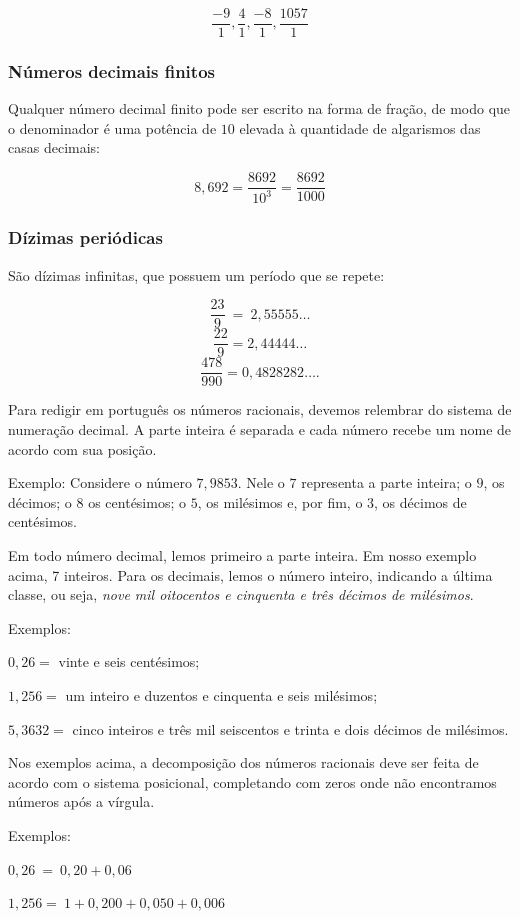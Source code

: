 { $$\frac{-9}{1},  \frac{4}{1}, \frac{-8}{1},  \frac{1057}{1}$$

\subsubsection*{Números decimais finitos} Qualquer número decimal finito pode ser
escrito na forma de fração, de modo que o denominador é uma potência de
$10$ elevada à quantidade de algarismos das casas decimais:

$$8,692  = \frac{8692}{10^{3}} = \frac{8692}{1000}$$

\subsubsection*{Dízimas periódicas} 
São dízimas infinitas, que possuem um período que se repete: 

$$\frac{23}{9}\  = \ 2,55555\ldots{}$$
$$\frac{22}{9} = 2,44444\ldots{}$$
$$\frac{478}{990} = 0,4828282\ldots{}.$$

Para redigir em português os números racionais, devemos relembrar do
sistema de numeração decimal. A parte inteira é separada e cada número
recebe um nome de acordo com sua posição.

\medskip\noindent Exemplo: Considere o número 
$7,9853$. Nele o $7$ representa a parte inteira; o $9$, os décimos; o $8$ os centésimos; o $5$, os milésimos e, por fim, o $3$,
os décimos de centésimos.

Em todo número decimal, lemos primeiro a parte inteira. Em nosso exemplo acima, 7
inteiros. Para os decimais, lemos o número inteiro, indicando a última
classe, ou seja, \textit{nove mil oitocentos e cinquenta e três décimos de
milésimos}.

\medskip\noindent Exemplos:

$0,26 =$ vinte e seis centésimos;

$1,256 =$ um inteiro e duzentos e cinquenta e seis milésimos;

$5,3632 =$ cinco inteiros e três mil seiscentos e trinta e dois décimos de
milésimos.


\medskip
Nos exemplos acima, a decomposição dos números racionais deve ser feita de 
acordo com o sistema posicional, completando com zeros onde não encontramos 
números após a vírgula.

\medskip\noindent Exemplos:

$0,26\  = \ 0,20 + 0,06$

$1,256 = \ 1 + 0,200 + 0,050 + 0,006$

}
